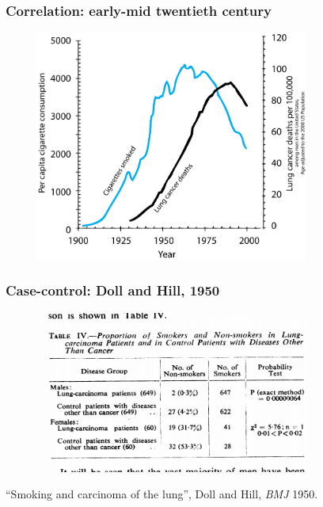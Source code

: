 \documentclass[handout]{beamer}
\begin{document}
\begin{frame}
	\frametitle{Correlation: early-mid twentieth century}
	
	\begin{figure}[ht]
		\centerline{\includegraphics[width=0.8\textwidth]{../figures/smoking_cancer.png}}
	\end{figure}
	
\end{frame}

\begin{frame}
	\frametitle{Case-control: Doll and Hill, 1950}
	
	\begin{figure}[ht]
		\centerline{\includegraphics[width=0.8\textwidth]{../figures/doll_hill_table}}
	\end{figure}
	\footnotesize ``Smoking and carcinoma of the lung'', Doll and Hill, \textit{BMJ} 1950.
\end{frame}
\end{document}
